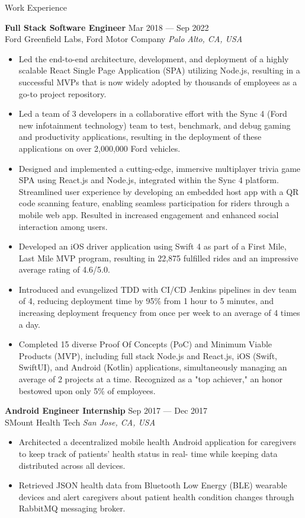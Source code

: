 \documentclass{resume} %
\begin{document}
\begin{rSection}{Work Experience}

\textbf{Full Stack Software Engineer} \hfill Mar 2018 --- Sep 2022 \\
Ford Greenfield Labs, Ford Motor Company \hfill \textit{Palo Alto, CA, USA}
\begin{itemize}
    \item Led the end-to-end architecture, development, and deployment of a highly scalable React Single Page Application (SPA) utilizing Node.js, resulting in a successful MVPs that is now widely adopted by thousands of employees as a go-to project repository.
    \item Led a team of 3 developers in a collaborative effort with the Sync 4 (Ford new infotainment technology) team to test, benchmark, and debug gaming and productivity applications, resulting in the deployment of these applications on over 2,000,000 Ford vehicles.
    \item Designed and implemented a cutting-edge, immersive multiplayer trivia game SPA using React.js and Node.js, integrated within the Sync 4 platform. Streamlined user experience by developing an embedded host app with a QR code scanning feature, enabling seamless participation for riders through a mobile web app. Resulted in increased engagement and enhanced social interaction among users.
    \item Developed an iOS driver application using Swift 4 as part of a First Mile, Last Mile MVP program, resulting in 22,875 fulfilled rides and an impressive average rating of 4.6/5.0.
    \item Introduced and evangelized TDD with CI/CD Jenkins pipelines in dev team of 4, reducing deployment time by 95\% from 1 hour to 5 minutes, and increasing deployment frequency from once per week to an average of 4 times a day. 
    \item Completed 15 diverse Proof Of Concepts (PoC) and Minimum Viable Products (MVP), including full stack Node.js and React.js, iOS (Swift, SwiftUI), and Android (Kotlin) applications, simultaneously managing an average of 2 projects at a time. Recognized as a "top achiever," an honor bestowed upon only 5\% of employees.
\end{itemize}
    
\textbf{Android Engineer Internship} \hfill Sep 2017 --- Dec 2017 \\
SMount Health Tech \hfill \textit{San Jose, CA, USA}
\begin{itemize}
    \item Architected a decentralized mobile health Android application for caregivers to keep track of patients’ health status in real- time while keeping data distributed across all devices.
    \item Retrieved JSON health data from Bluetooth Low Energy (BLE) wearable devices and alert caregivers about patient health condition changes through RabbitMQ messaging broker.
\end{itemize}

\end{rSection} 
\end{document}
